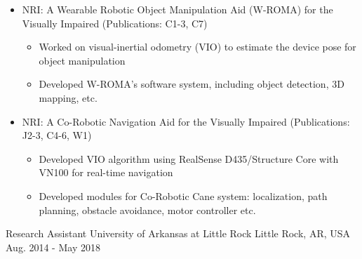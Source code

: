 \begin{cventries}
{%
      	  \vspace{-4.0mm}
      	\begin{justify}
      		\begin{itemize}[leftmargin=2ex, nosep, noitemsep]
      			\setlength{\parskip}{0pt}
      			\renewcommand{\labelitemi}{\bullet}
      			\item {NRI: A Wearable Robotic Object Manipulation Aid (W-ROMA) for the Visually Impaired (Publications: C1-3, C7)}
      			\begin{itemize}[leftmargin=3ex]
      				\scriptsize
      				\item {Worked on visual-inertial odometry (VIO) to estimate the device pose for object manipulation}
      				\item {Developed W-ROMA's software system, including object detection, 3D mapping, etc. }
      			\end{itemize}
      			\item {NRI: A Co-Robotic Navigation Aid for the Visually Impaired (Publications: J2-3, C4-6, W1)}
      			\begin{itemize}[leftmargin=3ex]
      				\scriptsize
      				\item {Developed VIO algorithm using RealSense D435/Structure Core with VN100 for real-time navigation}
      				\item {Developed modules for Co-Robotic Cane system: localization, path planning, obstacle avoidance, motor controller etc.}
      			\end{itemize}
      		\end{itemize}
      	\end{justify}
      	\vspace{-4.0mm}  
     }
  \cventry
    {Research Assistant} %
    {University of Arkansas at Little Rock} %
    {Little Rock, AR, USA} %
    {Aug. 2014 - May 2018} %
    {
    	  \vspace{-4.0mm}
 \begin{justify}
 	\begin{itemize}[leftmargin=2ex, nosep, noitemsep]

\end{itemize}
\end{justify}}
\end{cventries}
